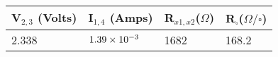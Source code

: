\begin{tabular}{@{}llll@{}}
\toprule
\textbf{V$_{2,3}$ (Volts)} & \textbf{I$_{1,4}$ (Amps)} & \textbf{R$_{x1,x2} $($\Omega $)} & \textbf{R$_\square$($\Omega / \square $)} \\ \midrule
2.338                      & $1.39\times10^{-3}$              & 1682                             & 168.2                                     \\ \bottomrule
\end{tabular}